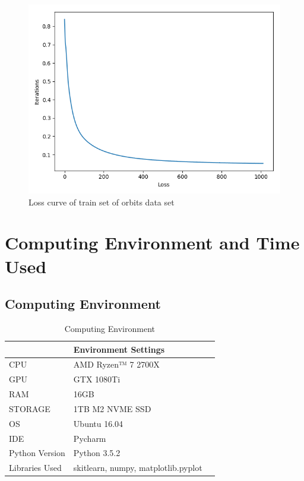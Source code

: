 \documentclass{article}
\begin{document}
\begin{figure}[h]
  \centering
  \includegraphics[scale=0.3]{loss_orbits.png}
  \caption{Loss curve of train set of orbits data set}
\end{figure}


\pagebreak

\section{Computing Environment and Time Used}

\subsection{Computing Environment}

\begin{table}[htb]
	\caption{Computing Environment}
	\label{sample-table}
	\centering
	\begin{tabular}{lll}
		\toprule
		\cmidrule{1-2}
		    &  Environment Settings	\\
		\midrule
		CPU & AMD Ryzen™ 7 2700X   \\
		GPU & GTX 1080Ti        \\
		RAM & 16GB \\
		STORAGE & 1TB M2 NVME SSD \\
		OS & Ubuntu 16.04 \\
		IDE & Pycharm \\
		Python Version & Python 3.5.2 \\
		Libraries Used & skitlearn, numpy, matplotlib.pyplot \\
		\bottomrule
	\end{tabular}
\end{table}
\end{document}
